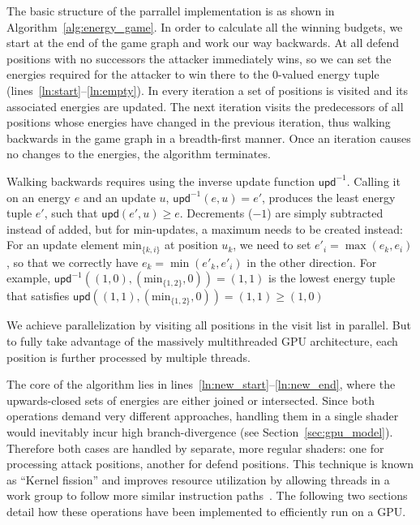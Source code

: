 The basic structure of the parrallel implementation
is as shown in Algorithm~\ref{alg:energy_game}.
In order to calculate all the winning budgets,
we start at the end of the game graph and work our way backwards.
At all defend positions with no successors the attacker immediately wins,
so we can set the energies required for the attacker to win there to the
0-valued energy tuple (lines~\ref{ln:start}--\ref{ln:empty}).
In every iteration a set of positions is visited
and its associated energies are updated.
The next iteration visits the predecessors of all positions whose energies
have changed in the previous iteration,
thus walking backwards in the game graph in a breadth-first manner.
Once an iteration causes no changes to the energies, the algorithm terminates.

Walking backwards requires using the inverse update function
$\mathsf{upd}^{-1}$.
Calling it on an energy $e$ and an update $u$, $\mathsf{upd}^{-1}(e, u) = e'$,
produces the least energy tuple $e'$, such that $\mathsf{upd}(e', u) \geq e$.
Decrements ($-1$) are simply subtracted instead of added,
but for $\mathrm{min}$-updates, a maximum needs to be created instead:
For an update element $\mathrm{min}_{\{k, i\}}$ at position $u_k$,
we need to set $e'_i = \max(e_k, e_i)$,
so that we correctly have $e_k = \min(e'_k, e'_i)$ in the other direction.
For example,
$\mathsf{upd}^{-1}((1, 0), (\mathrm{min}_{\{1, 2\}}, 0)) = (1, 1)$
is the lowest energy tuple that satisfies
$\mathsf{upd}((1, 1), (\mathrm{min}_{\{1, 2\}}, 0)) = (1, 1)
    \geq (1, 0)$

We achieve parallelization by visiting all positions in the visit list
in parallel.
But to fully take advantage of the massively multithreaded
GPU architecture, each position is further processed by multiple threads.

The core of the algorithm lies in lines~\ref{ln:new_start}--\ref{ln:new_end},
where the upwards-closed sets of energies are either joined or intersected.
Since both operations demand very different approaches,
handling them in a single shader would inevitably incur high branch-divergence
(see Section~\ref{sec:gpu_model}).
Therefore both cases are handled by separate, more regular shaders:
one for processing attack positions, another for defend positions.
This technique is known as \enquote{Kernel fission}
and improves resource utilization by allowing threads in a work group to follow
more similar instruction paths~\cite{Hijma2023}.
The following two sections detail how these operations have been implemented to
efficiently run on a GPU\@.


